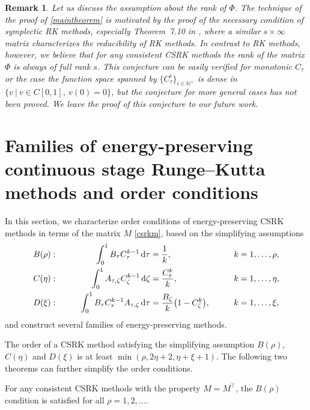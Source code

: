 \documentclass[final,leqno,onefignum,onetabnum]{siamltex1213}
\DeclarePairedDelimiter\paren{\lparen}{\rparen}
\newtheorem{remark}{Remark}
\begin{document}
\begin{remark}
\label{rem:con}
Let us discuss the assumption about the rank of $\Phi$.
The technique of the proof of \autoref{maintheorem}
is motivated by the proof of the necessary condition of symplectic RK methods,
especially Theorem~7.10 in \cite[Chapter IV]{ha06},
where a similar $s\times\infty$ matrix characterizes the reducibility of RK methods.
In contrast to RK methods, however, 
we believe that for any consistent CSRK methods the rank of the matrix $\Phi$
is always of full rank $s$.
This conjecture can be easily verified for monotonic $C_\tau$
or the case the function space spanned by
$\{ C_\tau^i\}_{i\in \mathbb{N}^+}$ is dense in $\{v \ | \ v\in C[0,1], \ v(0)=0 \}$,
but
the conjecture for more general cases has not been proved.
We leave the proof of this conjecture to our future work.
\end{remark}

\section{Families of energy-preserving continuous stage Runge--Kutta methods and order conditions}
\label{sec4}

In this section, we characterize order conditions of energy-preserving CSRK methods
in terms of the matrix $M$ \eqref{csrkm},
based on the simplifying assumptions
\begin{alignat*}{4}
B(\rho):& \qquad& \int_0^1 B_\tau C_\tau^{k-1}\, {\mathrm d}\tau &= \frac{1}{k}, && \qquad k=1,\dots,\rho,\\
C(\eta):& \qquad& \int_0^1 A_{\tau,\zeta}C_\zeta^{k-1}\,{\mathrm d}\zeta 
&= \frac{C_\tau^k}{k}, && \qquad k=1,\dots,\eta, \\
D(\xi) :& \qquad& \int_0^1 B_\tau C_\tau^{k-1}A_{\tau,\zeta} \,{\mathrm d} \tau
&= \frac{B_\zeta}{k}\paren*{1-C_\zeta^k}, && \qquad k=1,\dots,\xi,
\end{alignat*}
and construct several families of energy-preserving methods.

The order of a CSRK method satisfying the simplifying assumption
$B(\rho)$, $C(\eta)$ and $D(\xi)$
is at least $\min (\rho,2\eta+2,\eta+\xi+1)$.
The following two theorems can further simplify the order conditions.

\begin{theorem}
For any consistent CSRK methods with the property $M=M^\top$,
the $B(\rho)$ condition is satisfied for all $\rho=1,2,\dots$.
\end{theorem}
\end{document}
